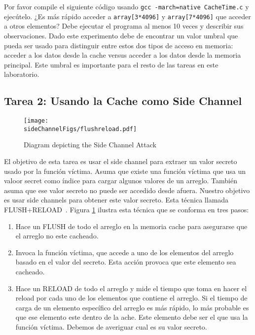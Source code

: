 Por favor compile el siguiente código usando \texttt{gcc -march=native
CacheTime.c} y ejecútelo. ¿Es más rápido acceder a \texttt{array[3*4096]} y \texttt{array[7*4096]} que acceder a otros elementos? Debe ejecutar el programa al menos 10 veces y describir sus observaciones. Dado este experimento debe de encontrar un valor umbral que pueda ser usado para distinguir entre estos dos tipos de acceso en memoria: acceder a los datos desde la cache versus acceder a los datos desde la memoria principal. Este umbral es importante para el resto de las tareas en este laboratorio.

\subsection{Tarea 2: Usando la Cache como Side Channel}


\begin{figure}[htb]
\centering
\texttt{[image: \\sideChannelFigs/flushreload.pdf]}
\caption{Diagram depicting the Side Channel Attack}
\label{sidechannel:fig:flushreload}
\end{figure}

El objetivo de esta tarea es usar el side channel para extraer un valor secreto usado por la función víctima. Asuma que existe una función víctima que usa un valoor secret como índice para cargar algunos valores de un arreglo. También asuma que ese valor secreto no puede ser accedido desde afuera. Nuestro objetivo es usar side channels para obtener este valor secreto. Esta técnica llamada FLUSH+RELOAD~\cite{Yarom2014}. Figura \ref{sidechannel:fig:flushreload} ilustra esta técnica que se conforma en tres pasos:

\begin{enumerate}[noitemsep]

\item Hace un FLUSH de todo el arreglo en la memoria cache para asegurarse que el arreglo no este cacheado.

\item Invoca la función víctima, que accede a uno de los elementos del arreglo basado en el valor del secreto. Esta acción provoca que este elemento sea cacheado.

\item Hace un RELOAD de todo el arreglo y mide el tiempo que toma en hacer el reload por cada uno de los elementos que contiene el arreglo. Si el tiempo de carga de un elemento específico del arreglo es más rápido, lo más probable es que ese elemento este dentro de la ache.
Este elemento debe ser el que usa la función víctima. 
Debemos de averiguar cual es su valor secreto.
\end{enumerate}

